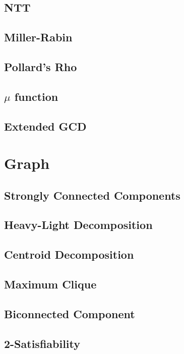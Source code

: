 \documentclass[a4paper,10pt,twocolumn,oneside]{article}
\begin{document}
\subsection{NTT}

\subsection{Miller-Rabin}

\subsection{Pollard's Rho}

\subsection{$\mu$ function}

\subsection{Extended GCD}

\section{Graph}
\subsection{Strongly Connected Components}

\subsection{Heavy-Light Decomposition}

\subsection{Centroid Decomposition}

\subsection{Maximum Clique}

\subsection{Biconnected Component}

\subsection{2-Satisfiability}

\end{document}
